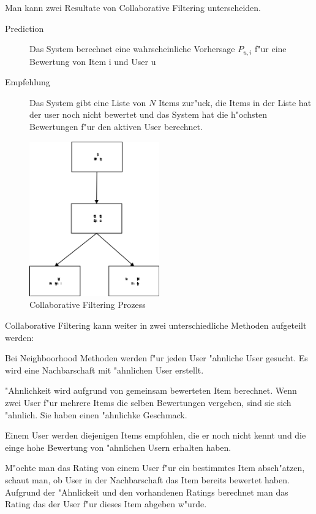 \documentclass[a4paper, 11pt]{article}
\begin{document}
Man kann zwei Resultate von Collaborative Filtering unterscheiden.

\begin{description}
\item[Prediction] Das System berechnet eine wahrscheinliche Vorhersage $P_{u,i}$ f"ur eine Bewertung von Item i und User u
\item[Empfehlung] Das System gibt eine Liste von $N$ Items zur"uck, die Items in der Liste hat der user noch nicht bewertet und das System hat die h"ochsten Bewertungen f"ur den aktiven User berechnet.
\end{description}

\begin{figure}[h]
  \centering
      \includegraphics[width=0.5\textwidth]{cf}
  \caption{Collaborative Filtering Prozess}
\end{figure}

Collaborative Filtering kann weiter in zwei unterschiedliche Methoden aufgeteilt werden:

Bei Neighboorhood Methoden werden f"ur jeden User "ahnliche User gesucht. Es wird eine Nachbarschaft mit "ahnlichen User erstellt.

"Ahnlichkeit wird aufgrund von gemeinsam bewerteten Item berechnet. Wenn zwei User f"ur mehrere Items die selben Bewertungen vergeben, sind sie sich "ahnlich. Sie haben einen "ahnlichke Geschmack.

Einem User werden diejenigen Items empfohlen, die er noch nicht kennt und die einge hohe Bewertung von "ahnlichen Usern erhalten haben.

 M"ochte man das Rating von einem User f"ur ein bestimmtes Item ab\-sch"atz\-en, schaut man, ob User in der Nachbarschaft das Item bereits bewertet haben. Aufgrund der "Ahnlickeit und den vorhandenen Ratings berechnet man das Rating das der User f"ur dieses Item abgeben w"urde.
\end{document}
